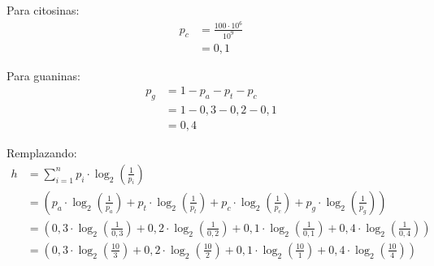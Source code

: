 \documentclass{templateNote}
\begin{document}
\begin{enumerate}
    \begin{minipage}{0.45\textwidth}
    Para citosinas:
    \begin{align*}
        p_{c} &= \frac{100 \cdot 10^6}{10^9} \\
        &= 0,1
    \end{align*}
    \end{minipage}
    \hfill
    \begin{minipage}{0.45\textwidth}
    Para guaninas:
    \begin{align*}
        p_{g} &= 1 - p_{a} - p_{t} - p_{c} \\
        &= 1 - 0,3 - 0,2 - 0,1 \\
        &= 0,4
    \end{align*}
    \end{minipage}

    Remplazando:
    \begin{align*}
        h &= \sum_{i=1}^{n} p_i \cdot \log_2 \left( \frac{1}{p_i} \right) \\
        &= \left( p_{a} \cdot \log_2 \left( \frac{1}{p_{a}} \right) + p_{t} \cdot \log_2 \left( \frac{1}{p_{t}} \right) + p_{c} \cdot \log_2 \left( \frac{1}{p_{c}} \right) + p_{g} \cdot \log_2 \left( \frac{1}{p_{g}} \right) \right) \\
        &= \left( 0,3 \cdot \log_2 \left( \frac{1}{0,3} \right) + 0,2 \cdot \log_2 \left( \frac{1}{0,2} \right) + 0,1 \cdot \log_2 \left( \frac{1}{0,1} \right) + 0,4 \cdot \log_2 \left( \frac{1}{0,4} \right) \right) \\
        &= \left( 0,3 \cdot \log_2 \left( \frac{10}{3} \right) + 0,2 \cdot \log_2 \left( \frac{10}{2} \right) + 0,1 \cdot \log_2 \left( \frac{10}{1} \right) + 0,4 \cdot \log_2 \left( \frac{10}{4} \right) \right) \\        
    \end{align*}

\end{enumerate}

\newpage
\end{document}

